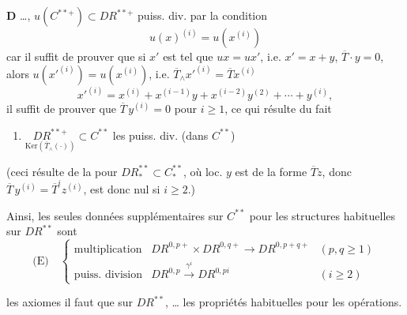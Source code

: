\documentclass[11pt,a4paper]{article}
\begin{document}
\textbf{D} \ldots,    $u(C^{**+}) \subset
DR^{**+}$   \og puiss. div. \fg{} 
 par la condition
\[
  u(x)^{(i)} = u(x^{(i)})
\]
car il suffit de prouver que si $x'$ est tel que $u x = u x'$, i.e. $x' = x + y$,
$\overline{T} \cdot y = 0$, alors $u(x'^{(i)}) = u(x^{(i)})$, i.e.
$\overline{T}_\wedge x'^{(i)} = \overline{T} x^{(i)}$
\[
  x'^{(i)} = x^{(i)} + x^{(i-1)} y + x^{(i-2)} y^{(2)} + \cdots + y^{(i)},
\]
il suffit de prouver que $\overline{T}\, y^{(i)} = 0$ pour $i \geq 1$, ce qui résulte du
fait \struck{\ill{}}
\begin{enumerate}
  \item[(D)] $\underset{\textstyle \mathrm{Ker}(\overline{T}_\wedge(\cdot))}{DR^{**+}} \subset C^{**}$
    les puiss. div. (dans $C^{**}$)
\end{enumerate}

(ceci   résulte de la  pour
$DR^{**}_* \subset C^{**}_*$, où loc. $y$ est de la forme $\overline{T} z$, donc
$\overline{T}\, y^{(i)} = \overline{T}^{i} z^{(i)}$,  est donc nul si
$i \geq 2$.)


Ainsi, les seules données supplémentaires sur $C^{**}$ pour 
 les structures habituelles sur $DR^{**}$ sont
\[
  \text{(E)} \quad
  \left\{\begin{array}{lll}
    \text{multiplication} & DR^{0,p+} \times DR^{0,q+} \longrightarrow DR^{0,p+q+} & (p, q \geq 1) \\
    \text{puiss. division} & DR^{0,p} \xrightarrow{\;\gamma^i\;} DR^{0,pi} & (i \geq 2)
  \end{array}\right.
\]


 les axiomes  il faut  
que sur $DR^{**}$, \ldots{} les propriétés habituelles pour les opérations.
\end{document}
